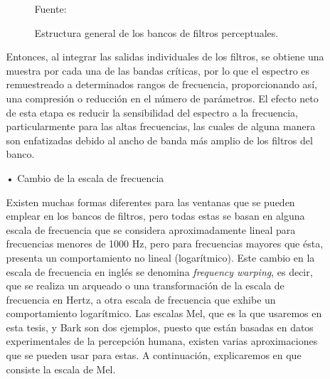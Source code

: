 \begin{enumerate}
\begin{enumerate}
\begin{figure}[H]
\begin{center}
\vskip -0.5cm
\caption{\small{Estructura general de los bancos de filtros perceptuales.}}
\label{fig:figura2.39}
{\small{Fuente: \cite{eyra}}}
\end{center}
\end{figure}
\vskip -0.5cm
Entonces, al integrar las salidas individuales de los filtros, se obtiene una muestra por cada una de las bandas críticas, por lo que el espectro es remuestreado a determinados rangos de frecuencia, proporcionando así, una compresión o reducción en el número de parámetros. 
\vskip 0.5cm
El efecto neto de esta etapa es reducir la sensibilidad del espectro a la frecuencia, particularmente para las altas frecuencias, las cuales de alguna manera son enfatizadas debido al ancho de banda más amplio de los filtros del banco.

\item[•]Cambio de la escala de frecuencia
\par
Existen muchas formas diferentes para las ventanas que se pueden emplear en los bancos de filtros, pero todas estas se basan en alguna escala de frecuencia que se considera aproximadamente lineal para frecuencias menores de 1000 Hz, pero para frecuencias mayores que ésta, presenta un comportamiento no lineal (logarítmico).
\vskip 0.5cm
Este cambio en la escala de frecuencia en inglés se denomina \textit{frequency warping}, es decir, que se realiza un arqueado o una transformación de la escala de frecuencia en Hertz, a otra escala de frecuencia que exhibe un comportamiento logarítmico. Las escalas Mel, que es la que usaremos en esta tesis, y Bark son dos ejemplos, puesto que están basadas en datos experimentales de la percepción humana, existen varias aproximaciones que se pueden usar para estas. A continuación, explicaremos en que consiste la escala de Mel.


\end{enumerate}
\end{enumerate}
